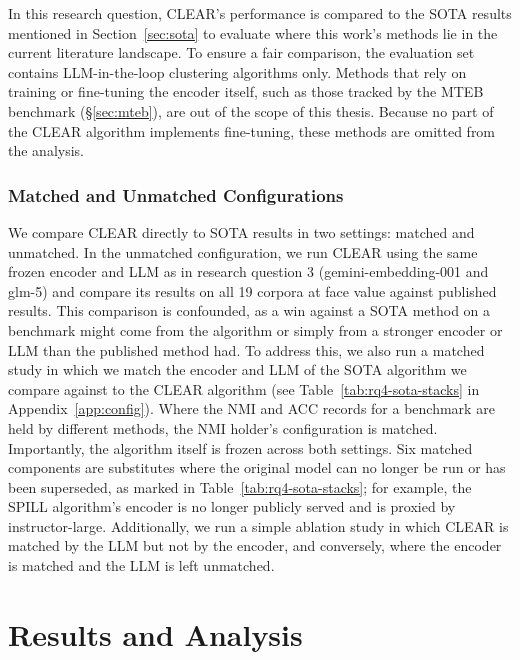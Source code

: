 \documentclass[11pt,a4paper,oneside]{report}
\begin{document}
In this research question, CLEAR's performance is compared to the SOTA results mentioned in Section~\ref{sec:sota} to evaluate where this work's methods lie in the current literature landscape. To ensure a fair comparison, the evaluation set contains LLM-in-the-loop clustering algorithms only. Methods that rely on training or fine-tuning the encoder itself, such as those tracked by the MTEB benchmark (\S\ref{sec:mteb}), are out of the scope of this thesis. Because no part of the CLEAR algorithm implements fine-tuning, these methods are omitted from the analysis.

\subsection{Matched and Unmatched Configurations}\label{sec:matchedconfigs}

We compare CLEAR directly to SOTA results in two settings: matched and unmatched. In the unmatched configuration, we run CLEAR using the same frozen encoder and LLM as in research question 3 ({\small\ttfamily gemini-embedding-001} and {\small\ttfamily glm-5}) and compare its results on all 19 corpora at face value against published results. This comparison is confounded, as a win against a SOTA method on a benchmark might come from the algorithm or simply from a stronger encoder or LLM than the published method had. To address this, we also run a matched study in which we match the encoder and LLM of the SOTA algorithm we compare against to the CLEAR algorithm (see Table~\ref{tab:rq4-sota-stacks} in Appendix~\ref{app:config}). Where the NMI and ACC records for a benchmark are held by different methods, the NMI holder's configuration is matched. Importantly, the algorithm itself is frozen across both settings. Six matched components are substitutes where the original model can no longer be run or has been superseded, as marked in Table~\ref{tab:rq4-sota-stacks}; for example, the SPILL algorithm's encoder is no longer publicly served and is proxied by {\small\ttfamily instructor-large}. Additionally, we run a simple ablation study in which CLEAR is matched by the LLM but not by the encoder, and conversely, where the encoder is matched and the LLM is left unmatched.

\FloatBarrier
\chapter{Results and Analysis}
\end{document}
